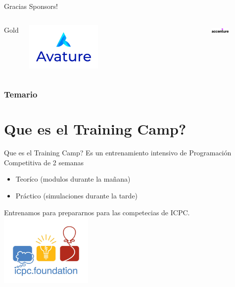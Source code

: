 \documentclass{beamer}
\begin{document}
\begin{frame}{Gracias Sponsors!}
\begin{columns}[t]
    \end{columns}
    \begin{columns}[t]
        \centering
        Gold\\
        \begin{minipage}{0.5\textwidth}
            \centering
            \includegraphics[width=0.4\textwidth,keepaspectratio]{logos/avature.jpg}
        \end{minipage}%
        \begin{minipage}{0.5\textwidth}
            \centering
            \includegraphics[width=0.4\textwidth,keepaspectratio]{logos/Acc_Logo_Black_Purple_RGB.png}
        \end{minipage}
    \end{columns}
\end{frame}


\begin{frame}
\frametitle{Temario}
\tableofcontents
\end{frame}


\section{Que es el Training Camp?}

\begin{frame}{Que es el Training Camp?}
Es un entrenamiento intensivo de Programación Competitiva de 2 semanas
\begin{itemize}
    \item Teoríco (modulos durante la mañana) 
    \item Práctico (simulaciones durante la tarde)
\end{itemize}
Entrenamos para prepararnos para las competecias de ICPC.
    \centering
    \includegraphics[clip,height=3.5cm,keepaspectratio]{logos/icpc.jpeg}
\end{frame}
\end{document}
